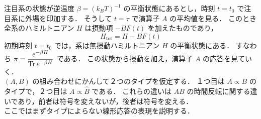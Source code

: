 \documentclass{jsarticle}
\title{}
\author{八木俊輔}
\date{\today}
\numberwithin{equation}{section}
\theoremstyle{definition}
\begin{document}
注目系の状態が逆温度 $\beta = (k_B T)^{-1}$ の平衡状態にあるとし，時刻 $t = t_0$ で注目系に外場を印加する．
そうして $t = \tau $ で演算子 $A$ の平均値を見る．
このとき全系のハミルトニアン $H$ は摂動項 $-BF(t)$ を加えたものであり，
\begin{equation}
  H_{\text{tot}} = H - BF(t)
\end{equation}
初期時刻 $t = t_0$ では，系は無摂動ハミルトニアン $H$ の平衡状態にある．
すなわち $\mathbf{\pi } = \dfrac{e^{-\beta H}}{\Tr e^{-\beta H}}$ である．
この状態から摂動を加え，演算子 $A$ の応答を見ていく．\\
\quad $(A, B)$ の組み合わせにかんして２つのタイプを仮定する．
１つ目は $A \propto  B$ のタイプで，２つ目は $A \propto \hat{B}$ である．
これらの違いは $AB$ の時間反転に関する違いであり，前者は符号を変えないが，後者は符号を変える．\\
\quad ここではまずタイプによらない線形応答の表現を説明する．
\end{document}
